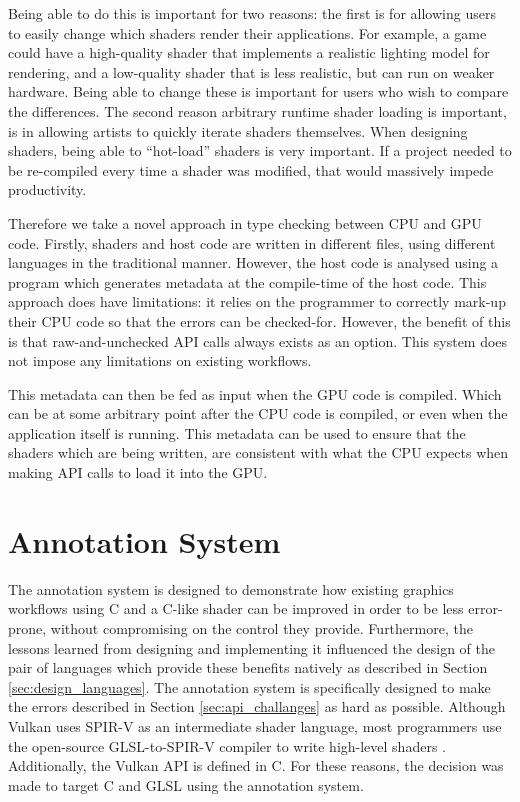 \documentclass[a4paper,12pt,twoside,openright]{report}
\begin{document}
Being able to do this is important for two reasons: the first is for allowing
users to easily change which shaders render their applications. For example, a
game could have a high-quality shader that implements a realistic lighting
model for rendering, and a low-quality shader that is less realistic, but can
run on weaker hardware. Being able to change these is important for users who
wish to compare the differences. The second reason arbitrary runtime shader
loading is important, is in allowing artists to quickly iterate shaders
themselves. When designing shaders, being able to ``hot-load'' shaders is very
important. If a project needed to be re-compiled every time a shader was
modified, that would massively impede productivity.

Therefore we take a novel approach in type checking between CPU and GPU code.
Firstly, shaders and host code are written in different files, using different
languages in the traditional manner. However, the host code is analysed using a
program which generates metadata at the compile-time of the host code. This
approach does have limitations: it relies on the programmer to correctly
mark-up their CPU code so that the errors can be checked-for. However, the
benefit of this is that raw-and-unchecked API calls always exists as an option.
This system does not impose any limitations on existing workflows.

This metadata can then be fed as input when the GPU code is compiled. Which can
be at some arbitrary point after the CPU code is compiled, or even when the
application itself is running. This metadata can be used to ensure that the
shaders which are being written, are consistent with what the CPU expects when
making API calls to load it into the GPU.

\section{Annotation System}

\label{sec:design_annotation_processor}

The annotation system is designed to demonstrate how existing graphics
workflows using C and a C-like shader can be improved in order to be less
error-prone, without compromising on the control they provide. Furthermore, the
lessons learned from designing and implementing it influenced the design of the
pair of languages which provide these benefits natively as described in Section
\ref{sec:design_languages}. The annotation system is specifically designed to
make the errors described in Section \ref{sec:api_challanges} as hard as
possible. Although Vulkan uses SPIR-V as an intermediate shader language, most
programmers use the open-source GLSL-to-SPIR-V compiler to write high-level
shaders \cite{TODO}. Additionally, the Vulkan API is defined in C. For these
reasons, the decision was made to target C and GLSL using the annotation
system.
\end{document}
